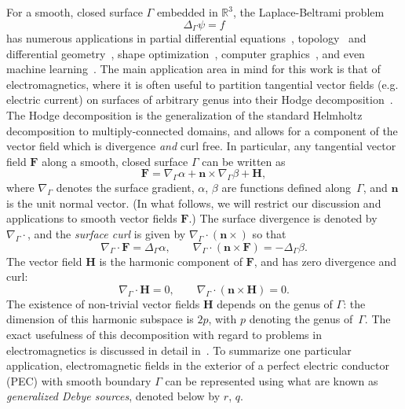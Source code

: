\documentclass[11pt]{article}
\newcommand{\surfdiv}{\nabla_\Gamma \cdot}
\newcommand{\surfgrad}{\nabla_\Gamma}
\newcommand{\surflap}{\Delta_\Gamma}
\newcommand{\bbR}{\mathbb R}
\newcommand{\bn}{\bm n}
\newcommand{\bF}{\bm F}
\newcommand{\bH}{\bm H}
\numberwithin{equation}{section}
\begin{document}
For a smooth, closed surface $\Gamma$ embedded in $\bbR^3$, the
Laplace-Beltrami problem
\begin{equation}\label{eq_lapbel}
\surflap \psi = f
\end{equation}
has numerous applications in partial differential
equations~\cite{EpGr,veerapaneni_2011,schwartz_2005},
topology~\cite{reuter_2010}
and differential geometry~\cite{mckean_1967},
shape optimization~\cite{sokolowski_1992},
computer graphics~\cite{chao_2010}, and even machine
learning~\cite{weiss_2009,belkin_2006}.
The main application area 
in mind for this work is that of electromagnetics, where it is often
 useful to partition tangential vector fields (e.g. electric
current)
on surfaces of
arbitrary genus into their Hodge decomposition~\cite{EpGr,EpGrOn}.
The Hodge decomposition is the generalization of the standard Helmholtz
decomposition to multiply-connected domains, and allows for a
component of the vector field which is divergence \emph{and} curl
free.
In particular, any tangential vector field $\bF$ along a smooth,
closed surface $\Gamma$ can be
written as
\begin{equation}
\bF = \surfgrad \alpha  + \bn \times 
\surfgrad \beta  + \bH,
\end{equation}
where $\surfgrad$ denotes the surface gradient, $\alpha$, $\beta$
are functions defined along~$\Gamma$, and $\bn$ is the unit normal
vector.
(In what follows,
we will restrict our 
discussion and applications to smooth vector fields $\bF$.)
The surface divergence
is denoted by $\surfdiv$, and the \emph{surface curl} is given by
$\surfdiv (\bn \times)$ so that
\begin{equation}
\surfdiv \bF = \surflap \alpha, \qquad \surfdiv (\bn \times \bF) =
-\surflap \beta.
\end{equation}
The vector field $\bH$ is the harmonic component of $\bF$, and has
zero divergence and curl:
\begin{equation}
\surfdiv \bH = 0, \qquad \surfdiv (\bn \times \bH) = 0.
\end{equation}
The existence of non-trivial vector 
fields $\bH$ depends on the genus of $\Gamma$:
the dimension of this harmonic subspace is $2p$, with $p$
denoting the genus of~$\Gamma$.  
The exact usefulness of this decomposition with
regard to problems in electromagnetics is discussed in detail
in~\cite{EpGr,EpGrOn,EpGrOn2,dai_2014}. To summarize one particular
application, electromagnetic fields
in the exterior of a perfect electric conductor (PEC)
with smooth boundary $\Gamma$
can be
represented using what are known as \emph{generalized Debye
  sources}, denoted below by $r$, $q$.
\end{document}
